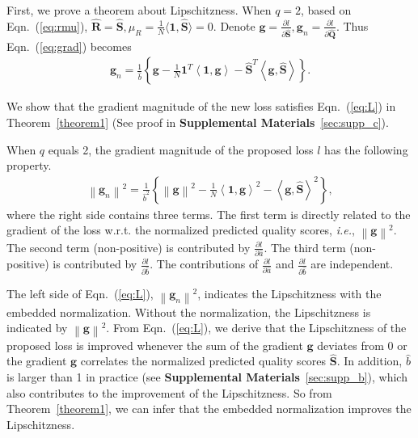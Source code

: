 \documentclass[sigconf]{acmart}
\begin{document}
First, we prove a theorem about Lipschitzness. 
When $q=2$, based on Eqn.~(\ref{eq:rmu}), $\hat{\mathbf{R}}=\hat{\mathbf{S}}, \mu_{\hat{R}}=\frac{1}{N}\langle\mathbf{1}, \hat{\mathbf{S}}\rangle=0$. 
Denote ${\mathbf{g}}=\frac{\partial l}{\partial \hat{\mathbf{S}}}, {\mathbf{g}}_n=\frac{\partial l}{\partial \hat{\mathbf{Q}}}$. 
Thus Eqn.~(\ref{eq:grad}) becomes
\begin{align}
{\mathbf{g}}_n = \frac{1}{\hat{b}} \left\{{\mathbf{g}}-\frac{1}{N}\mathbf{1}^T\left\langle\mathbf{1}, {\mathbf{g}}\right\rangle-\hat{\mathbf{S}}^T\left\langle{\mathbf{g}},\hat{\mathbf{S}}\right\rangle\right\}.
\end{align}

We show that the gradient magnitude of the new loss satisfies Eqn.~(\ref{eq:L}) in Theorem~\ref{theorem1} (See proof in \textbf{Supplemental Materials}~\ref{sec:supp_c}). 

\begin{theorem}[Lipschitzness]\label{theorem1}
When $q$ equals 2, the gradient magnitude of the proposed loss $l$ has the following property.
\begin{align}\label{eq:L}
\left\|{\mathbf{g}}_n\right\|^2 = \frac{1}{\hat{b}^2} \left\{\left\|{\mathbf{g}}\right\|^2-\frac{1}{N}\left\langle\mathbf{1}, {\mathbf{g}}\right\rangle^2-\left\langle{\mathbf{g}},\hat{\mathbf{S}}\right\rangle^2\right\}, 
\end{align}
where the right side contains three terms. 
The first term is directly related to the gradient of the loss w.r.t. the normalized predicted quality scores, \textit{i.e.}, $\left\|{\mathbf{g}}\right\|^2$. 
The second term (non-positive) is contributed by $\frac{\partial l}{\partial \hat{a}}$. 
The third term (non-positive) is contributed by $\frac{\partial l}{\partial \hat{b}}$. 
The contributions of $\frac{\partial l}{\partial \hat{a}}$ and $\frac{\partial l}{\partial \hat{b}}$ are independent.
\end{theorem}

The left side of Eqn.~(\ref{eq:L}), $\left\|{\mathbf{g}}_n\right\|^2$, indicates the Lipschitzness with the embedded normalization. 
Without the normalization, the Lipschitzness is indicated by $\left\|{\mathbf{g}}\right\|^2$. 
From Eqn.~(\ref{eq:L}), we derive that the Lipschitzness of the proposed loss is improved whenever the sum of the gradient ${\mathbf{g}}$ deviates from 0 or the gradient ${\mathbf{g}}$ correlates the normalized predicted quality scores $\hat{\mathbf{S}}$. 
In addition, ${\hat{b}}$ is larger than 1 in practice (see \textbf{Supplemental Materials}~\ref{sec:supp_b}), which also contributes to the improvement of the Lipschitzness. 
So from Theorem~\ref{theorem1}, we can infer that the embedded normalization improves the Lipschitzness.
\end{document}
